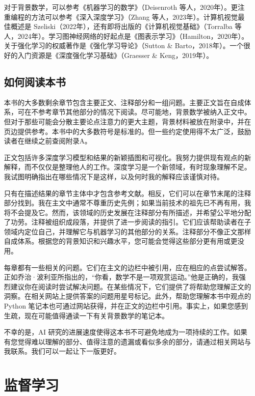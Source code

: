 \documentclass[lang=cn,newtx,10pt,scheme=chinese]{elegantbook}
\begin{document}
对于背景数学，可以参考《机器学习的数学》（Deisenroth 等人，2020年）。更注重编程的方法可以参考《深入深度学习》（Zhang 等人，2023年）。计算机视觉最佳概述是 Szeliski（2022年），还有即将出版的《计算机视觉基础》（Torralba 等人，2024年）。学习图神经网络的好起点是《图表示学习》（Hamilton，2020年）。关于强化学习的权威著作是《强化学习导论》（Sutton \& Barto，2018年）。一个很好的入门资源是《深度强化学习基础》（Graesser \& Keng，2019年）。

\section{如何阅读本书}
本书的大多数剩余章节包含主要正文、注释部分和一组问题。主要正文旨在自成体系，可在不参考章节其他部分的情况下阅读。尽可能地，背景数学被纳入正文中。但对于那些可能会分散主要论点注意力的更大主题，背景材料被放在附录中，并在页边提供参考。本书中的大多数符号是标准的。但一些约定使用得不太广泛，鼓励读者在继续之前查阅附录A。

正文包括许多深度学习模型和结果的新颖插图和可视化。我努力提供现有观点的新解释，而不仅仅是整理他人的工作。深度学习是一个新领域，有时现象理解不足。我试图明确指出在哪些情况下是这样，以及何时我的解释应该谨慎对待。

只有在描述结果的章节主体中才包含参考文献。相反，它们可以在章节末尾的注释部分找到。我在主文中通常不尊重历史先例；如果当前技术的祖先已不再有用，我将不会提及它。然而，该领域的历史发展在注释部分有所描述，并希望公平地分配了功劳。注释被组织成段落，并提供了进一步阅读的指引。它们应该帮助读者在子领域内定位自己，并理解它与机器学习的其他部分的关系。注释部分不像正文那样自成体系。根据您的背景知识和兴趣水平，您可能会觉得这些部分更有用或更没用。

每章都有一些相关的问题。它们在主文的边栏中被引用，应在相应的点尝试解答。正如乔治·波利亚所指出的，“你看，数学不是一项观赏运动。”他是正确的，我强烈建议你在阅读时尝试解决问题。在某些情况下，它们提供了将帮助您理解正文的洞察。在相关网站上提供答案的问题用星号标记。此外，帮助您理解本书中观点的 Python 笔记本也可通过网站获得，并在正文的边栏中引用。事实上，如果您感到生疏，现在可能值得通读一下有关背景数学的笔记本。

不幸的是，AI 研究的进展速度使得这本书不可避免地成为一项持续的工作。如果有您觉得难以理解的部分、值得注意的遗漏或看似多余的部分，请通过相关网站与我联系。我们可以一起让下一版更好。

\chapter{监督学习}
\end{document}
